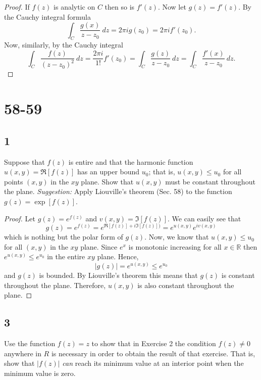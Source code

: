 \documentclass{article}
\newcommand{\R}{\mathbb{R}}
\begin{document}
\begin{proof}
    If $f(z)$ is analytic on $C$ then so is $f'(z)$. Now let $g(z) = f'(z)$.
    By the Cauchy integral formula
    \begin{equation*}
        \int_C \frac{g(x)}{z - z_0} \ dz = 2\pi i g(z_0) = 2\pi i f'(z_0).
    \end{equation*}
    Now, similarly, by the Cauchy integral
    \begin{equation}
        \int_C \frac{f(z)}{(z - z_0)^2} \ dz = \frac{2\pi i}{1!}f'(z_0)
        = \int_C \frac{g(z)}{z - z_0} \ dz = \int_C \frac{f'(x)}{z - z_0} \ dz.
    \end{equation}
\end{proof}

\section*{58-59}
\subsection*{1}
Suppose that $f(z)$ is entire and that the harmonic function $u(x,y) = \Re[f(z)]$
has an upper bound $u_0$; that is, $u(x,y) \leq u_0$ for all points $(x,y)$ in
the $xy$ plane. Show that $u(x,y)$ must be constant throughout the plane.
\textit{Suggestion:} Apply Liouville's theorem (Sec. 58) to the function
$g(z) = \exp[f(z)]$.

\begin{proof}
    Let $g(z) = e^{f(z)}$ and $v(x,y) = \Im[f(z)]$. We can easily see that
    \begin{equation*}
        g(z) = e^{f(z)} = e^{\Re[f(z)] + i\Im[f(z)])} = e^{u(x,y)}e^{iv(x,y)}
    \end{equation*}
    which is nothing but the polar form of $g(z)$. Now, we know that
    $u(x,y) \leq u_0$ for all $(x,y)$ in the $xy$ plane. Since $e^x$ is
    monotonic increasing for all $x \in \R$ then $e^{u(x,y)} \leq e^{u_0}$
    in the entire $xy$ plane. Hence,
    \begin{equation*}
        |g(z)| =  e^{u(x,y)} \leq e^{u_0}
    \end{equation*}
    and $g(z)$ is bounded. By Liouville's theorem this means that $g(z)$
    is constant throughout the plane. Therefore, $u(x,y)$ is also
    constant throughout the plane.
\end{proof}

\subsection*{3}
Use the function $f(z) = z$ to show that in Exercise 2 the condition $f(z) \neq 0$
anywhere in $R$ is necessary in order to obtain the result of that exercise.
That is, show that $|f(z)|$ \textit{can} reach its minimum value at an interior
point when the minimum value is zero.
\end{document}
